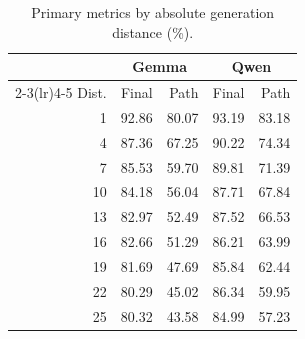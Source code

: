 \begin{table}[t]
\centering
\caption{Primary metrics by absolute generation distance (\%).}
\label{tab:distance}
\scriptsize
\begin{tabular}{r rr rr}
\toprule
& \multicolumn{2}{c}{Gemma} & \multicolumn{2}{c}{Qwen} \\
\cmidrule(lr){2-3}\cmidrule(lr){4-5}
Dist. & Final & Path & Final & Path \\
\midrule
1  & 92.86 & 80.07 & 93.19 & 83.18 \\
4  & 87.36 & 67.25 & 90.22 & 74.34 \\
7  & 85.53 & 59.70 & 89.81 & 71.39 \\
10 & 84.18 & 56.04 & 87.71 & 67.84 \\
13 & 82.97 & 52.49 & 87.52 & 66.53 \\
16 & 82.66 & 51.29 & 86.21 & 63.99 \\
19 & 81.69 & 47.69 & 85.84 & 62.44 \\
22 & 80.29 & 45.02 & 86.34 & 59.95 \\
25 & 80.32 & 43.58 & 84.99 & 57.23 \\
\bottomrule
\end{tabular}
\end{table}

